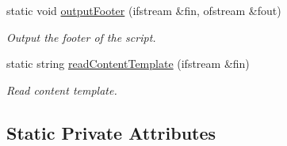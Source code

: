 \begin{DoxyCompactItemize}
static void \hyperlink{classmultiscale_1_1video_1_1PolarGnuplotScriptGenerator_ad572033c31036eb4b3fd041eaf70ec5f}{output\-Footer} (ifstream \&fin, ofstream \&fout)
\begin{DoxyCompactList}\small\item\em Output the footer of the script. \end{DoxyCompactList}\item 
static string \hyperlink{classmultiscale_1_1video_1_1PolarGnuplotScriptGenerator_a539bef80a3f6313a0df4c72107075e35}{read\-Content\-Template} (ifstream \&fin)
\begin{DoxyCompactList}\small\item\em Read content template. \end{DoxyCompactList}\end{DoxyCompactItemize}
\subsection*{Static Private Attributes}
